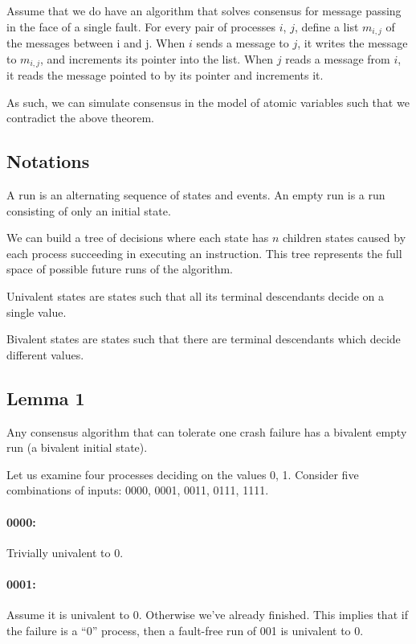 \documentclass{idc_msc}
\begin{document}
Assume that we do have an algorithm that solves consensus for message passing in the face of a single fault.
For every pair of processes $i$, $j$, define a list $m_{i,j}$ of the messages between i and j.
When $i$ sends a message to $j$, it writes the message to $m_{i,j}$, and increments its pointer into the list.
When $j$ reads a message from $i$, it reads the message pointed to by its pointer and increments it.

As such, we can simulate consensus in the model of atomic variables such that we contradict the above theorem.

\subsection{Notations}

A run is an alternating sequence of states and events.
An empty run is a run consisting of only an initial state.

We can build a tree of decisions where each state has $n$ children states caused by each process succeeding in executing an instruction. This tree represents the full space of possible future runs of the algorithm.

Univalent states are states such that all its terminal descendants decide on a single value.

Bivalent states are states such that there are terminal descendants which decide different values.

\subsection{Lemma 1}
Any consensus algorithm that can tolerate one crash failure has a bivalent empty run (a bivalent initial state).

Let us examine four processes deciding on the values 0, 1. Consider five combinations of inputs: 0000, 0001, 0011, 0111, 1111.

\paragraph{0000:}
Trivially univalent to 0.

\paragraph{0001:}
Assume it is univalent to 0. Otherwise we've already finished.
This implies that if the failure is a ``0'' process, then a fault-free run of 001 is univalent to 0.
\end{document}
